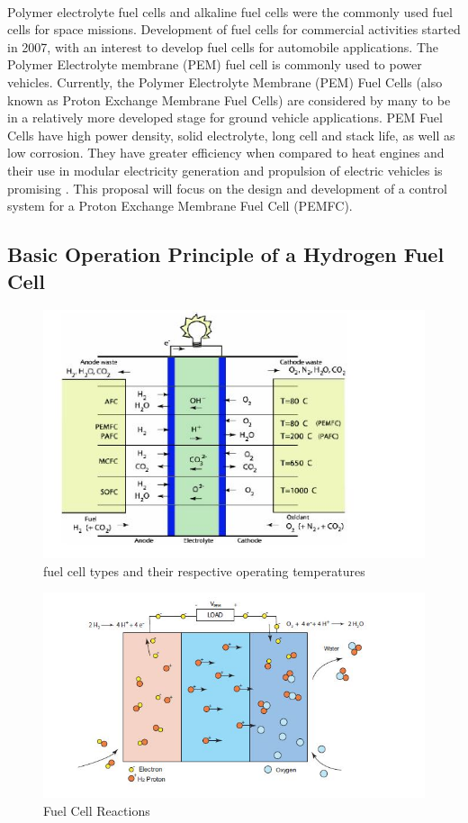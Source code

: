 \paragraph{}Polymer electrolyte fuel cells and alkaline fuel cells were the commonly used fuel cells for space missions. Development of fuel cells for commercial activities started in 2007, with an interest to develop fuel cells for automobile applications. The Polymer Electrolyte membrane (PEM) fuel cell is commonly used to power vehicles. Currently, the Polymer Electrolyte Membrane (PEM) Fuel Cells (also known as Proton Exchange Membrane Fuel Cells) are considered by many to be in a relatively more developed stage for ground vehicle applications. PEM Fuel Cells have high power density, solid electrolyte, long cell and stack life, as well as low corrosion. They have greater eﬃciency when compared to heat engines and their use in modular electricity generation and propulsion of electric vehicles is promising \cite{holze_supramanian_2007}. This proposal will focus on the design and development of a control system for a Proton Exchange Membrane Fuel Cell (PEMFC).

\subsection{Basic Operation Principle of a Hydrogen  Fuel Cell}
\begin{figure}[!h]
\includegraphics{Figures/Figure1}
\caption{fuel cell types and their respective operating temperatures
\cite{stefanopoulou_mechatronics_nodate}}
\end{figure}
\begin{figure}[!h]
\includegraphics{Figures/Figure2}
\caption{Fuel Cell Reactions
\cite{pukrushpan_modeling_2003}}
\end{figure}
